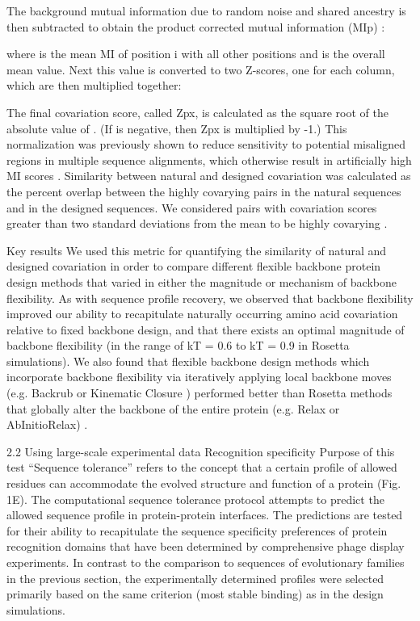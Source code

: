 The background mutual information due to random noise and shared ancestry is then subtracted to obtain the product corrected mutual information (MIp) \cite{dunn_mutual_2008}:



where  is the mean MI of position i with all other positions and  is the overall mean value. Next this value is converted to two Z-scores, one for each column, which are then multiplied together:


The final covariation score, called Zpx, is calculated as the square root of the absolute value of . (If  is negative, then Zpx is multiplied by -1.) This normalization was previously shown to reduce sensitivity to potential misaligned regions in multiple sequence alignments, which otherwise result in artificially high MI scores \cite{dickson_identifying_2010}. Similarity between natural and designed covariation was calculated as the percent overlap between the highly covarying pairs in the natural sequences and in the designed sequences. We considered pairs with covariation scores greater than two standard deviations from the mean to be highly covarying \cite{ollikainen_computational_2013}.

Key results
We used this metric for quantifying the similarity of natural and designed covariation in order to compare different flexible backbone protein design methods that varied in either the magnitude or mechanism of backbone flexibility. As with sequence profile recovery, we observed that backbone flexibility improved our ability to recapitulate naturally occurring amino acid covariation relative to fixed backbone design, and that there exists an optimal magnitude of backbone flexibility (in the range of kT = 0.6 to kT = 0.9 in Rosetta simulations). We also found that flexible backbone design methods which incorporate backbone flexibility via iteratively applying local backbone moves (e.g. Backrub \cite{smith_backrub-like_2008} or Kinematic Closure \cite{mandell_sub-angstrom_2009}) performed better than Rosetta methods that globally alter the backbone of the entire protein (e.g. Relax or AbInitioRelax) \cite{ollikainen_computational_2013}.

2.2 Using large-scale experimental data
Recognition specificity
Purpose of this test
“Sequence tolerance” refers to the concept that a certain profile of allowed residues can accommodate the evolved structure and function of a protein (Fig. 1E). The computational sequence tolerance protocol attempts to predict the allowed sequence profile in protein-protein interfaces. The predictions are tested for their ability to recapitulate the sequence specificity preferences of protein recognition domains that have been determined by comprehensive phage display experiments. In contrast to the comparison to sequences of evolutionary families in the previous section, the experimentally determined profiles were selected primarily based on the same criterion (most stable binding) as in the design simulations.

